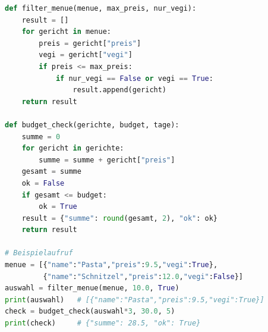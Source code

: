 \begin{myexercise}
	\begin{myanswer}
		\begin{lstlisting}[language=Python]
def filter_menue(menue, max_preis, nur_vegi):
    result = []
    for gericht in menue:
        preis = gericht["preis"]
        vegi = gericht["vegi"]
        if preis <= max_preis:
            if nur_vegi == False or vegi == True:
                result.append(gericht)
    return result

def budget_check(gerichte, budget, tage):
    summe = 0
    for gericht in gerichte:
        summe = summe + gericht["preis"]
    gesamt = summe
    ok = False
    if gesamt <= budget:
        ok = True
    result = {"summe": round(gesamt, 2), "ok": ok}
    return result

# Beispielaufruf
menue = [{"name":"Pasta","preis":9.5,"vegi":True},
         {"name":"Schnitzel","preis":12.0,"vegi":False}]
auswahl = filter_menue(menue, 10.0, True)
print(auswahl)   # [{"name":"Pasta","preis":9.5,"vegi":True}]
check = budget_check(auswahl*3, 30.0, 5)
print(check)     # {"summe": 28.5, "ok": True}
\end{lstlisting}
	\end{myanswer}
\end{myexercise}
\clearpage
